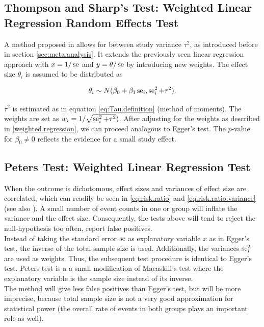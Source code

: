 \documentclass[11pt,a4paper,twoside]{book}\usepackage[]{graphicx}\usepackage[]{color}
\begin{document}


\subsection{Thompson and Sharp's Test: Weighted Linear Regression Random Effects Test} \label{sec:Thompson}
A method proposed in \citet{thompson.sharp} allows for between study variance $\tau^2$, as introduced before in section \ref{sec:meta.analysis}. It extends the previously seen linear regression approach with $x = 1/\operatorname{se}$ and $y = \theta/\operatorname{se}$ by introducing new weights. The effect size $\theta_i$ is assumed to be distributed as

\begin{align}
\theta_i \sim N(\beta_0 + \beta_1 \operatorname{se}_i, \operatorname{se}_i^2 + \tau^2). \label{t.sharp.regression}
\end{align}

$\tau^2$ is estimated as in equation \eqref{eq:Tau.definition} (method of moments). %
The weights are set as $w_i = 1/\sqrt{\operatorname{se}_i^2 + \tau^2})$. After adjusting for the weights as described in \ref{weighted.regression}, we can proceed analogous to Egger's test. The  $p$\hspace{0.4mm}-value for $\beta_{0} \neq 0$ reflects the evidence for a small study effect.


\subsection{Peters Test: Weighted Linear Regression Test} \label{sec:Peter}
When the outcome is dichotomous, effect sizes and variances of effect size are correlated, which can readily be seen in \eqref{eq:risk.ratio} and \eqref{eq:risk.ratio.variance} (see also \cite[p. 120]{meta.w.R}). A small number of event counts in one or group will inflate the variance and the effect size. Consequently, the tests above will tend to reject the null-hypothesis too often, \ie report false positives.\\ 
Instead of taking the standard error $\operatorname{se}$ as explanatory variable $x$ as in Egger's test, the inverse of the total sample size is used. Additionally, the variances $\operatorname{se}_i^2$ are used as weights. Thus, the subsequent test procedure is identical to Egger's test. Peters test is a a small modification of Macaskill's test where the explanatory variable is the sample size instead of its inverse. \\
The method will give less false positives than Egger's test, but will be more imprecise, because total sample size is not a very good approximation for statistical power (the overall rate of events in both groups plays an important role as well).
\end{document}

